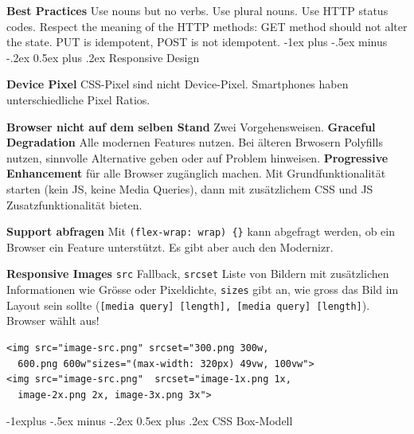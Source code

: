 \documentclass[a4paper, fontsize=6pt]{scrartcl}
\makeatletter
\renewcommand{\section}{\@startsection{section}{1}{0mm}%
    {-1ex plus -.5ex minus -.2ex}%
    {0.5ex plus .2ex}%
    {\normalfont\large\bfseries}}
\renewcommand{\subsection}{\@startsection{subsection}{2}{0mm}%
    {-1explus -.5ex minus -.2ex}%
    {0.5ex plus .2ex}%
    {\normalfont\normalsize\bfseries}}
\newcommand{\css}[1]{\texttt{#1}}
\newcommand{\html}[1]{\texttt{#1}}
\makeatother
\begin{document}
\begin{multicols*}{5}
\textbf{Best Practices}
Use nouns but no verbs. Use plural nouns. Use HTTP status codes. Respect the meaning of the HTTP methods: GET method should not alter the state. PUT is idempotent, POST is not idempotent.
\section{Responsive Design}

\textbf{Device Pixel}
CSS-Pixel sind nicht Device-Pixel. Smartphones haben unterschiedliche Pixel Ratios.

\textbf{Browser nicht auf dem selben Stand}
Zwei Vorgehensweisen. \textbf{Graceful Degradation} Alle modernen Features nutzen. Bei älteren Brwosern Polyfills nutzen, sinnvolle Alternative geben oder auf Problem hinweisen. \textbf{Progressive Enhancement} für alle Browser zugänglich machen. Mit Grundfunktionalität starten (kein JS, keine Media Queries), dann mit zusätzlichem CSS und JS Zusatzfunktionalität bieten.

\textbf{Support abfragen}
Mit \css{\@supports (flex-wrap: wrap) \{\}} kann abgefragt werden, ob ein Browser ein Feature unterstützt. Es gibt aber auch den Modernizr.

\textbf{Responsive Images}
\html{src} Fallback, \html{srcset} Liste von Bildern mit zusätzlichen Informationen wie Grösse oder Pixeldichte, \html{sizes} gibt an, wie gross das Bild im Layout sein sollte (\css{[media query] [length], [media query] [length]}). Browser wählt aus!

\begin{verbatim}
<img src="image-src.png" srcset="300.png 300w, 
  600.png 600w"sizes="(max-width: 320px) 49vw, 100vw">
<img src="image-src.png"  srcset="image-1x.png 1x,
  image-2x.png 2x, image-3x.png 3x">
\end{verbatim}

\subsection{CSS Box-Modell}


\end{multicols*}
\end{document}
